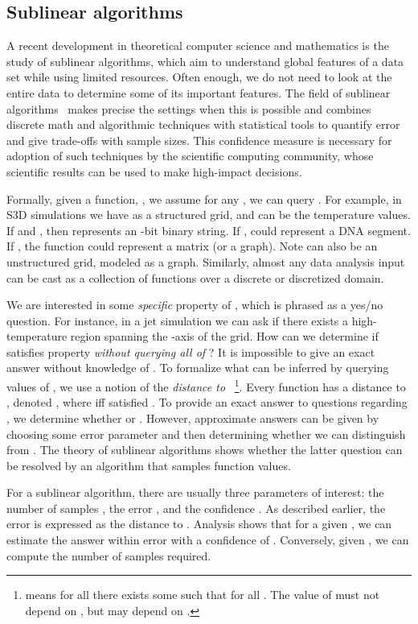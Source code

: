 \documentclass[final]{siamltex}
\begin{document}
\subsection{Sublinear algorithms}
A recent development in theoretical computer science and mathematics is the
study of sublinear algorithms,  which aim to understand global features of a data set  while using limited resources. 
Often enough,  we do not need to look at the entire data to determine some of its important features.  The field of sublinear 
algorithms~\cite{FischerSurvey,RonSurvey, RubSurvey} makes precise the settings when this is possible and combines discrete math and algorithmic 
techniques with statistical tools to quantify error and give trade-offs with sample sizes.  This confidence measure is necessary for  adoption 
of such techniques by the scientific computing community, whose scientific results can be used
to make high-impact decisions.

Formally,  given a function, , we assume  for any , we can
query . 
For example, in S3D simulations we have   as a structured grid, and  can be  the temperature values. 
If  and , then  represents an -bit binary string. If ,
  could represent a DNA segment. If , the function could represent a matrix (or
a graph). Note   can also be an unstructured grid, modeled as a graph. Similarly, almost any data analysis input can be cast as a 
collection of functions over a discrete or discretized domain.

We are interested in some \emph{specific} property of , which is phrased  as
a yes/no question. For instance, in a jet simulation we can ask  if there  exists a high-temperature region spanning the -axis of the grid. 
How can we determine if  satisfies property  \emph{without querying all of }? 
It is impossible to give an exact answer without knowledge of . To formalize what can be inferred
by querying  values of , we use a notion of the \emph{distance to
}~\footnote{  means for all  there exists some  such that  for all . The value of  must not
depend on , but may depend on .}.
Every function  has a distance to , denoted , where  iff 
satisfied . To provide an exact answer to questions regarding , we determine
whether  or . However, approximate answers can be given by 
choosing some error parameter  and then determining whether we  can distinguish
 from .
The theory of sublinear algorithms shows whether the latter question can be resolved  by an algorithm that samples  function values.

For a sublinear algorithm, there are usually three parameters of interest: the number of samples , the error , and the
confidence . As described earlier, the error is expressed as the distance to .
Analysis shows that for a given , we can estimate
the  answer within error  with a confidence of . Conversely, given ,
we can compute the number of samples required.
\end{document}
